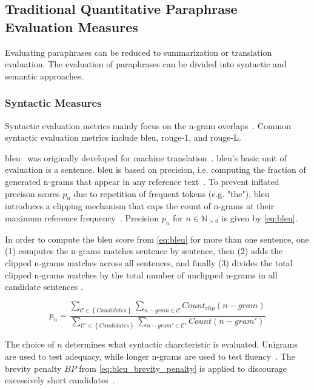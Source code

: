 \subsection{Traditional Quantitative Paraphrase Evaluation Measures}
\label{subsec:traditional_quantitative_evaluation_measures}

Evaluating paraphrases can be reduced to summarization or translation evaluation.
The evaluation of paraphrases can be divided into syntactic and semantic approaches. 

\subsubsection{Syntactic Measures}
Syntactic evaluation metrics mainly focus on the n-gram overlaps~\citep{zhou_paraphrase_2021}. 
Common syntactic evaluation metrics include \acs{bleu}, \acs{rouge}-1, and \acs{rouge}-L.

\ac{bleu}~\citep{papineni_bleu_2001} was originally developed for machine translation~\citep{zhou_paraphrase_2021}. 
\ac{bleu}'s basic unit of evaluation is a sentence. 
\ac{bleu} is based on precision, i.e. computing the fraction of generated n-grams that appear in any reference text~\citep{kurt_pehlivanoglu_comparative_2024,palivela_optimization_2021,papineni_bleu_2001}. 
To prevent inflated precison scores $p_n$ due to repetition of frequent tokens (e.g. "the"), \ac{bleu} introduces a clipping mechanism that caps the count of n-grams at their maximum reference frequency~\citep{papineni_bleu_2001}. 
Precision $p_n$ for $n \in \mathbb{N}_{>0}$ is given by \autoref{eq:bleu}.

In order to compute the \ac{bleu} score from \autoref{eq:bleu} for more than one sentence, 
one (1) computes the n-grams matches sentence by sentence, 
then (2) adds the clipped n-grams matches across all sentences, 
and finally (3) divides the total clipped n-grams matches by 
the total number of unclipped n-grams in all candidate sentences \citep{papineni_bleu_2001}.

\begin{equation}
    p_n = \frac{\sum_{\mathcal{C} \in \left\{ Candidates \right\}}\sum_{n-gram \in\mathcal{C}}Count_{clip}(n-gram)}{\sum_{\mathcal{C'} \in \left\{ Candidates \right\}}\sum_{n-gram' \in\mathcal{C'}}Count(n-gram')}
\label{eq:bleu}
\end{equation}

The choice of $n$ determines what syntactic charcteristic is evaluated.
Unigrams are used to test adequacy, while longer n-grams are used to test fluency~\citep{papineni_bleu_2001}. 
The brevity penalty $BP$ from \autoref{eq:bleu_brevity_penalty} is applied to discourage excessively short candidates~\citep{papineni_bleu_2001}.

